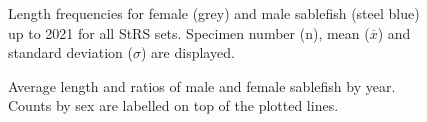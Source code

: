 \documentclass[12pt]{article}\usepackage[]{graphicx}\usepackage[]{color}
\begin{document}
\begin{figure}[htb]

{\centering {} 

}

\caption{Length frequencies for female (grey) and male sablefish (steel blue) up to 2021 for all StRS sets. Specimen number (n), mean (\(\overline{x}\)) and standard deviation (\(\sigma\)) are displayed.}\label{fig:figure12}
\end{figure}

\begin{figure}[htb]

{\centering {} 

}

\caption{Average length and ratios of male and female sablefish by year. Counts by sex are labelled on top of the plotted lines.}\label{fig:figure13}
\end{figure}
\clearpage
\end{document}
